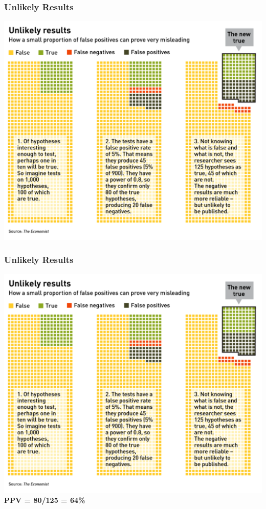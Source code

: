 \documentclass[10pt, block=fill]{beamer}
\begin{document}
\begin{frame}
    \frametitle{Unlikely Results}
    
    \begin{center}
        \includegraphics[width=0.9\linewidth]{figures/unlikely_results.png}
    \end{center}
\end{frame}


\begin{frame}
    \frametitle{Unlikely Results}
    
    \begin{center}
        \includegraphics[width=0.75\linewidth]{figures/unlikely_results.png}
    \colorbox{burntOrange}
        {\textbf{PPV = 80/125 = 64\%} }

    \end{center}
\end{frame}
\end{document}
